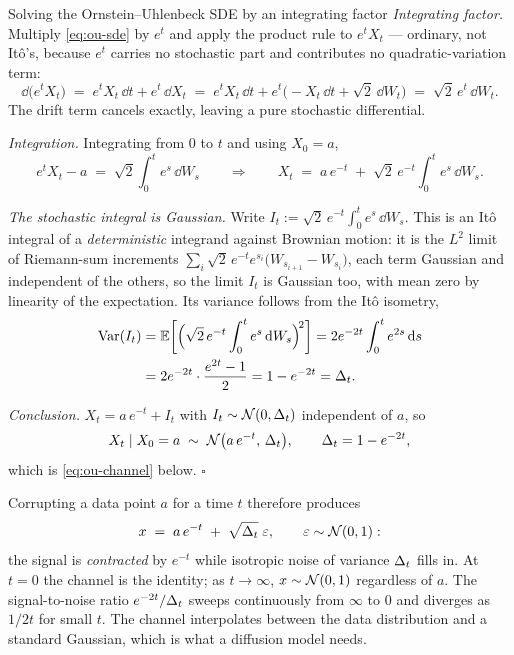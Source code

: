 \begin{toolbox}[tb:ou-solution]{Solving the Ornstein--Uhlenbeck SDE by an
integrating factor}
\emph{Integrating factor.} Multiply \eqref{eq:ou-sde} by $e^{t}$ and apply
the product rule to $e^{t}X_t$ --- ordinary, not Itô's, because $e^t$ carries
no stochastic part and contributes no quadratic-variation term:
\begin{equation*}
  \dd\big(e^{t}X_t\big)
  \;=\; e^{t}X_t\,\dd t + e^{t}\,\dd X_t
  \;=\; e^{t}X_t\,\dd t + e^{t}\big(-X_t\,\dd t + \sqrt2\,\dd W_t\big)
  \;=\; \sqrt2\, e^{t}\,\dd W_t .
\end{equation*}
The drift term cancels exactly, leaving a pure stochastic differential.

\emph{Integration.} Integrating from $0$ to $t$ and using $X_0 = a$,
\begin{equation*}
  e^{t}X_t - a \;=\; \sqrt2 \int_0^t e^{s}\,\dd W_s
  \qquad\Longrightarrow\qquad
  X_t \;=\; a\,e^{-t} \;+\; \sqrt2\, e^{-t}\int_0^t e^{s}\,\dd W_s .
\end{equation*}

\emph{The stochastic integral is Gaussian.} Write
$I_t := \sqrt2\,e^{-t}\int_0^t e^{s}\,\dd W_s$. This is an Itô integral of a
\emph{deterministic} integrand against Brownian motion: it is the $L^2$ limit
of Riemann-sum increments $\sum_i \sqrt2\,e^{-t}e^{s_i}
\big(W_{s_{i+1}}-W_{s_i}\big)$, each term Gaussian and independent of the
others, so the limit $I_t$ is Gaussian too, with mean zero by linearity of
the expectation. Its variance follows from the Itô isometry,
\begin{equation*}
\begin{aligned}
  \operatorname{Var}(I_t)
  &= \mathbb{E}\bigg[\Big(\sqrt2\,e^{-t}\int_0^t e^{s}\,\mathrm{d} W_s\Big)^{\!2}\bigg]
   = 2e^{-2t}\int_0^t e^{2s}\,\mathrm{d} s \\
  &= 2e^{-2t}\cdot\frac{e^{2t}-1}{2}
   = 1-e^{-2t}
   = \Delta_t .
\end{aligned}
\end{equation*}

\emph{Conclusion.} $X_t = a\,e^{-t} + I_t$ with $I_t \sim \mathcal{N}(0,\Delta_t)$
independent of $a$, so
\begin{equation*}
  X_t \mid X_0 = a \;\sim\; \mathcal{N}\big(a\,e^{-t},\, \Delta_t\big),
  \qquad \Delta_t = 1 - e^{-2t},
\end{equation*}
which is \eqref{eq:ou-channel} below. \hfill$\square$
\end{toolbox}

Corrupting a data point $a$ for a time $t$ therefore
produces
\begin{equation}
  x \;=\; a\, e^{-t} \;+\; \sqrt{\Delta_t}\;\varepsilon,
  \qquad \varepsilon \sim \mathcal{N}(0, 1):
  \label{eq:ou-channel}
\end{equation}
the signal is \emph{contracted} by $e^{-t}$ while isotropic noise of variance
$\Delta_t$ fills in. At $t = 0$ the channel is the identity; as $t \to \infty$,
$x \sim \mathcal{N}(0,1)$ regardless of $a$. The signal-to-noise ratio
$e^{-2t}/\Delta_t$ sweeps continuously from $\infty$ to $0$ and diverges as
$1/2t$ for small $t$. The channel interpolates between the data distribution and a
standard Gaussian, which is what a diffusion model needs.



